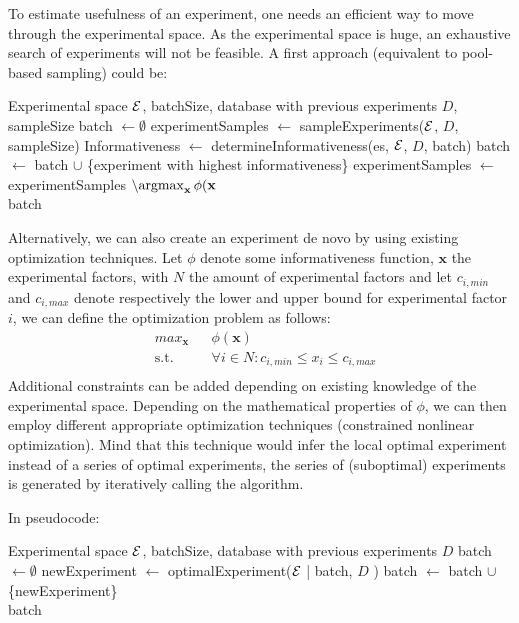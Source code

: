 \documentclass{article}
\begin{document}
To estimate usefulness of an experiment, one needs an efficient way to 
move through the experimental space. As the experimental space is huge, an exhaustive search of experiments will not be feasible. A first approach (equivalent to pool-based sampling) could be:

\setlength{\textfloatsep}{10pt}%

\begin{algorithmic}
\Require Experimental space $\mathcal{E}$, batchSize, database with previous experiments $D$, sampleSize
\State batch $\leftarrow \emptyset$
\State experimentSamples $\leftarrow$ sampleExperiments($\mathcal{E}$, $D$, sampleSize)
     \State Informativeness $\leftarrow$ determineInformativeness(es, $\mathcal{E}$, $D$, batch)
   \EndFor
   \State batch $\leftarrow$ batch $\cup$ \{experiment with highest informativeness\}
   \State experimentSamples $\leftarrow$ experimentSamples $\setminus { \argmax_{\mathbf{x}} \phi(\mathbf{x} } $
   \EndWhile \\
   \Return batch
\EndFunction
\end{algorithmic}

Alternatively, we can also create an experiment de novo by using existing optimization techniques. Let $\phi$ denote some informativeness function, $\mathbf{x}$ the experimental factors, with $N$ the amount of experimental factors 
and let $c_{i,min}$ and $c_{i,max}$ denote respectively the lower and upper bound for experimental factor $i$, we can define the optimization problem as follows:
\begin{equation}\label{eq:opt_data_select}
 \begin{aligned}
  & max_{\mathbf{x}} & & \phi(\mathbf{x}) \\
  & \text{s.t.} & & \forall i \in N: c_{i,min} \leq x_i \leq c_{i,max} \\
 \end{aligned}
\end{equation}
Additional constraints can be added depending on existing knowledge of the experimental space.
Depending on the mathematical properties of $\phi$, we can then employ different appropriate optimization techniques (constrained nonlinear optimization).
Mind that this technique would infer the local optimal experiment instead of a series of optimal experiments, the series of (suboptimal) experiments is generated by iteratively calling the algorithm.

In pseudocode:
\begin{algorithmic}
  \Require Experimental space $\mathcal{E}$, batchSize, database with previous experiments $D$ 
  \State  batch $\leftarrow \emptyset$ 
  \State newExperiment $\leftarrow$ optimalExperiment($\mathcal{E}$ | batch, $D$ )
  \State batch $\leftarrow$ batch $\cup$ \{newExperiment\} 
  \EndWhile \\ 
  \Return batch 
  \EndFunction 
\end{algorithmic} 
 
 
\end{document}
